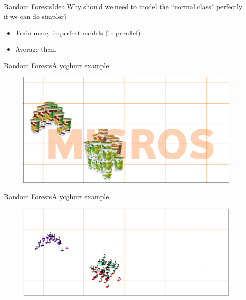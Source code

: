 \documentclass{beamer}
\begin{document}
\subsection{}
\begin{frame}{Random Forests}{Idea}
Why should we need to model the ``normal class'' perfectly if we can do simpler?
\begin{itemize}
	\item Train many imperfect models (in parallel)
	\item Average them
\end{itemize}
\end{frame}
\begin{frame}{Random Forests}{A yoghurt example}
\begin{figure}
	\centering
	\includegraphics[width=\textwidth]{labelled-data-migros}
\end{figure}
\end{frame}

\begin{frame}{Random Forests}{A yoghurt example}
	\begin{figure}
		\centering
		\includegraphics[width=\textwidth]{labelled-data.pdf}
	\end{figure}
\end{frame}
\end{document}
